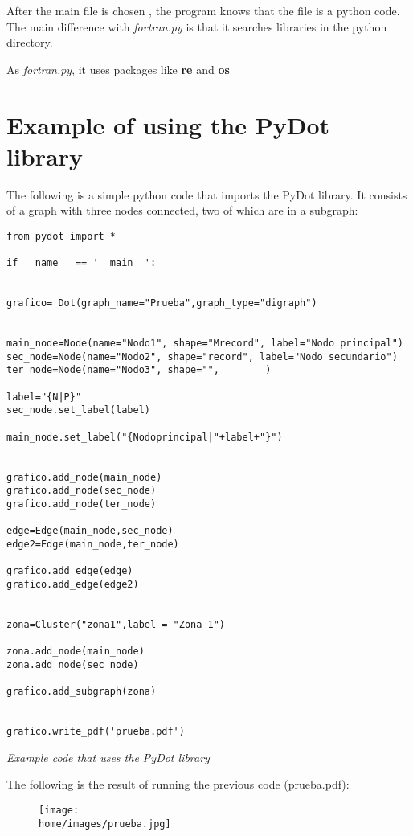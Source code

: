 After the main file is chosen , the program knows that the file is a python code. The main difference with \textit{fortran.py} is that it searches libraries in the python directory.

As \textit{fortran.py}, it uses packages like \textbf{re} and \textbf{os}

\section*{Example of using the PyDot library}

The following is a simple python code that imports the PyDot library. It consists of a graph with three nodes connected, two of which are in a subgraph:

\begin{lstlisting}
from pydot import *

if __name__ == '__main__':


grafico= Dot(graph_name="Prueba",graph_type="digraph")


main_node=Node(name="Nodo1", shape="Mrecord", label="Nodo principal")
sec_node=Node(name="Nodo2", shape="record", label="Nodo secundario")
ter_node=Node(name="Nodo3", shape="",        ) 

label="{N|P}"
sec_node.set_label(label)

main_node.set_label("{Nodoprincipal|"+label+"}")


grafico.add_node(main_node)
grafico.add_node(sec_node)
grafico.add_node(ter_node)

edge=Edge(main_node,sec_node)
edge2=Edge(main_node,ter_node)

grafico.add_edge(edge)
grafico.add_edge(edge2)


zona=Cluster("zona1",label = "Zona 1")

zona.add_node(main_node)
zona.add_node(sec_node)

grafico.add_subgraph(zona)


grafico.write_pdf('prueba.pdf')
\end{lstlisting}
\begin{center}
\textit{Example code that uses the PyDot library}
\end{center}
\vspace{3cm}
The following is the result of running the previous code (prueba.pdf):

\begin{figure}[H]
    \begin{center}
        \texttt{[image: \\home/images/prueba.jpg]}
    \end{center}
\end{figure}




